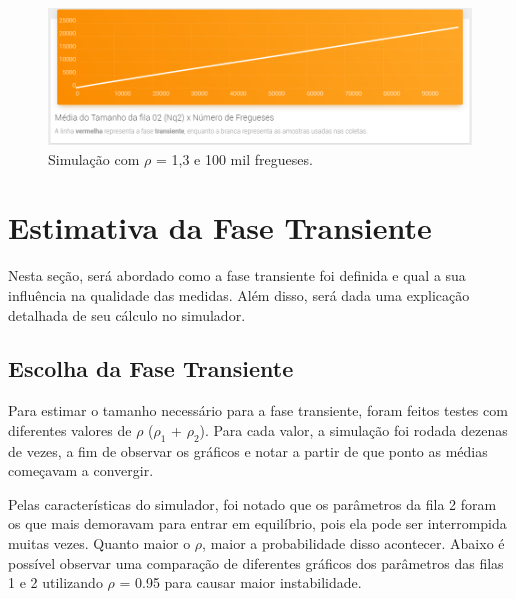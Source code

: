 \documentclass[a4paper,12pt]{report}
\begin{document}
\begin{figure}[H]
\includegraphics[width=1\textwidth]{./graficos/nq2rho1_3.png}
\vspace{-10mm}
\caption{Simulação com $\rho$ = 1,3 e 100 mil fregueses.}
\end{figure}

\chapter{Estimativa da Fase Transiente}

Nesta seção, será abordado como a fase transiente foi definida e qual a sua influência na qualidade das medidas. Além disso, será dada uma explicação detalhada de seu cálculo no simulador.

\section{Escolha da Fase Transiente}

Para estimar o tamanho necessário para a fase transiente, foram feitos testes com diferentes valores de $\rho$ ($\rho_1$ + $\rho_2$). Para cada valor, a simulação foi rodada dezenas de vezes, a fim de observar os gráficos e notar a partir de que ponto as médias começavam a convergir.

Pelas características do simulador, foi notado que os parâmetros da fila 2 foram os que mais demoravam para entrar em equilíbrio, pois ela pode ser interrompida muitas vezes. Quanto maior o $\rho$, maior a probabilidade disso acontecer. Abaixo é possível observar uma comparação de diferentes gráficos dos parâmetros das filas 1 e 2 utilizando $\rho$ = 0.95 para causar maior instabilidade.
\end{document}

